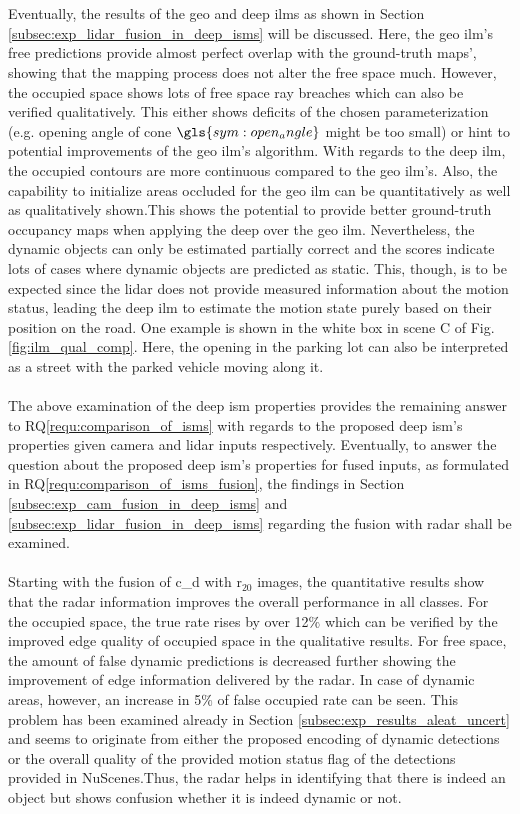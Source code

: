 \\\\
Eventually, the results of the geo and deep \gls{ilm}s as shown in Section \ref{subsec:exp_lidar_fusion_in_deep_isms} will be discussed. Here, the geo \gls{ilm}'s free predictions provide almost perfect overlap with the ground-truth maps', showing that the mapping process does not alter the free space much. However, the occupied space shows lots of free space ray breaches which can also be verified qualitatively. This either shows deficits of the chosen parameterization (e.g. opening angle of cone $\gls{sym:open_angle}$ might be too small) or hint to potential improvements of the geo \gls{ilm}'s algorithm. With regards to the deep \gls{ilm}, the occupied contours are more continuous compared to the geo \gls{ilm}'s. Also, the capability to initialize areas occluded for the geo \gls{ilm} can be quantitatively as well as qualitatively shown.This shows the potential to provide better ground-truth occupancy maps when applying the deep over the geo \gls{ilm}. Nevertheless, the dynamic objects can only be estimated partially correct and the scores indicate lots of cases where dynamic objects are predicted as static. This, though, is to be expected since the lidar does not provide measured information about the motion status, leading the deep \gls{ilm} to estimate the motion state purely based on their position on the road. One example is shown in the white box in scene C of Fig. \ref{fig:ilm_qual_comp}. Here, the opening in the parking lot can also be interpreted as a street with the parked vehicle moving along it.
\\\\
The above examination of the deep \gls{ism} properties provides the remaining answer to RQ\ref{requ:comparison_of_isms} with regards to the proposed deep \gls{ism}'s properties given camera and lidar inputs respectively. Eventually, to answer the question about the proposed deep \gls{ism}'s properties for fused inputs, as formulated in RQ\ref{requ:comparison_of_isms_fusion}, the findings in Section \ref{subsec:exp_cam_fusion_in_deep_isms} and \ref{subsec:exp_lidar_fusion_in_deep_isms} regarding the fusion with radar shall be examined.
\\\\
Starting with the fusion of \gls{c_d} with \gls{r}$_{20}$ images, the quantitative results show that the radar information improves the overall performance in all classes. For the occupied space, the true rate rises by over 12$\%$ which can be verified by the improved edge quality of occupied space in the qualitative results. For free space, the amount of false dynamic predictions is decreased further showing the improvement of edge information delivered by the radar. In case of dynamic areas, however, an increase in 5$\%$ of false occupied rate can be seen. This problem has been examined already in Section \ref{subsec:exp_results_aleat_uncert} and seems to originate from either the proposed encoding of dynamic detections or the overall quality of the provided motion status flag of the detections provided in NuScenes.Thus, the radar helps in identifying that there is indeed an object but shows confusion whether it is indeed dynamic or not.  
